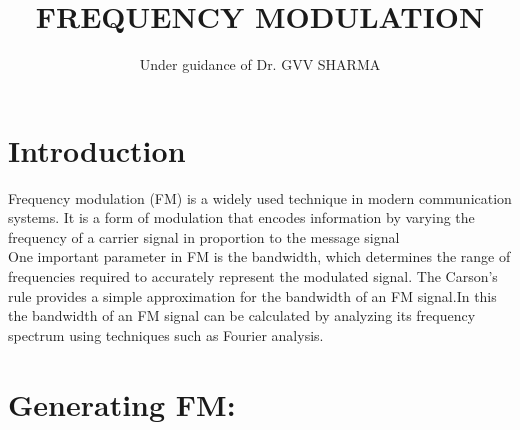 \documentclass[journal,5pt,twocolumn]{IEEEtran}
\renewcommand\thesection{\arabic{section}}
\begin{document}
\let\StandardTheFigure\thefigure
\let\StandardTheFigure\thefigure
\let\StandardTheTable\thetable
\let\vec\mathbf
\def\putbox#1#2#3{\makebox[0in][l]{\makebox[#1][l]{}\raisebox{\baselineskip}[0in][0in]{\raisebox{#2}[0in][0in]{#3}}}}
     \def\rightbox#1{\makebox[0in][r]{#1}}
     \def\centbox#1{\makebox[0in]{#1}}
     \def\topbox#1{\raisebox{-\baselineskip}[0in][0in]{#1}}
     \def\midbox#1{\raisebox{-0.5\baselineskip}[0in][0in]{#1}}
\title{ 
FREQUENCY MODULATION
}
\author{ Under guidance of Dr. GVV SHARMA}%
\maketitle
\tableofcontents
\section{\textbf{Introduction}}
Frequency modulation (FM) is a widely used technique in modern communication systems. It is a form of modulation that encodes information by varying the frequency of a carrier signal in proportion to the message signal\\
One important parameter in FM is the bandwidth, which determines the range of frequencies required to accurately represent the modulated signal. The Carson's rule provides a simple approximation for the bandwidth of an FM signal.In this the bandwidth of an FM signal can be calculated by analyzing its frequency spectrum using techniques such as Fourier analysis.
\section{\textbf{Generating FM:}}
\end{document}
